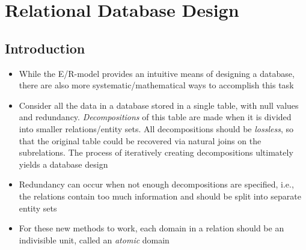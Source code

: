 \documentclass[a4paper]{article}
\begin{document}
\section{Relational Database Design}
\subsection{Introduction}
\begin{itemize}
\item While the E/R-model provides an intuitive means of designing a database, there are also more systematic/mathematical ways to accomplish this task
\item Consider all the data in a database stored in a single table, with null values and redundancy. \emph{Decompositions} of this table are made when it is divided into smaller relations/entity sets. All decompositions should be \emph{lossless}, so that the original table could be recovered via natural joins on the subrelations. The process of iteratively creating decompositions ultimately yields a database design
\item Redundancy can occur when not enough decompositions are specified, i.e., the relations contain too much information and should be split into separate entity sets
\item For these new methods to work, each domain in a relation should be an indivisible unit, called an \emph{atomic} domain
\end{itemize}
\end{document}
